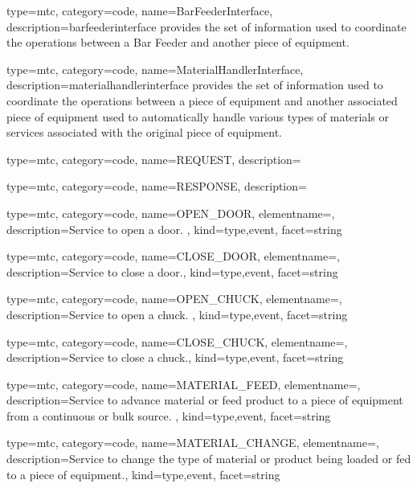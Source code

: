 {
  type=mtc,
  category=code,
  name={BarFeederInterface},
  description={\gls{barfeederinterface} provides the set of information used to coordinate the operations between a Bar Feeder and another piece of equipment.  }
}


{
  type=mtc,
  category=code,
  name={MaterialHandlerInterface},
  description={\gls{materialhandlerinterface} provides the set of information used to coordinate the operations between a piece of equipment and another associated piece of equipment used to automatically handle various types of materials or services associated with the original piece of equipment. }
}


{
  type=mtc,
  category=code,
  name={REQUEST},
  description={}
}


{
  type=mtc,
  category=code,
  name={RESPONSE},
  description={}
}


{
  type=mtc,
  category=code,
  name={OPEN\_DOOR},
  elementname=,
  description={Service to open a door. },
  kind={type,event},
  facet={\gls{string}}
}


{
  type=mtc,
  category=code,
  name={CLOSE\_DOOR},
  elementname=,
  description={Service to close a door.},
  kind={type,event},
  facet={\gls{string}}
}


{
  type=mtc,
  category=code,
  name={OPEN\_CHUCK},
  elementname=,
  description={Service to open a chuck. },
  kind={type,event},
  facet={\gls{string}}
}


{
  type=mtc,
  category=code,
  name={CLOSE\_CHUCK},
  elementname=,
  description={Service to close a chuck.},
  kind={type,event},
  facet={\gls{string}}
}


{
  type=mtc,
  category=code,
  name={MATERIAL\_FEED},
  elementname=,
  description={Service to advance material or feed product to a piece of equipment from a continuous or bulk source. },
  kind={type,event},
  facet={\gls{string}}
}


{
  type=mtc,
  category=code,
  name={MATERIAL\_CHANGE},
  elementname=,
  description={Service to change the type of material or product being loaded or fed to a piece of equipment.},
  kind={type,event},
  facet={\gls{string}}
}


